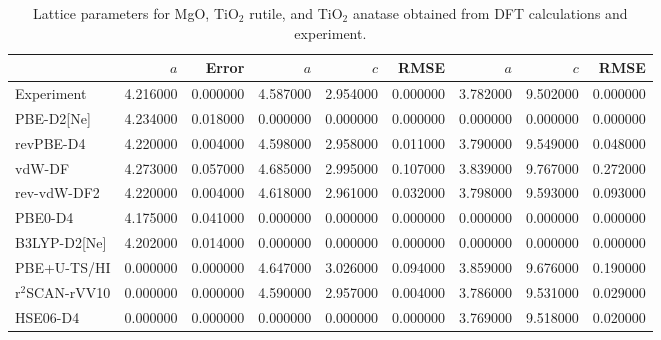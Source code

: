 \begin{table}
\caption{\label{tab:lattice_parameters}Lattice parameters for MgO, TiO$_2$ rutile, and TiO$_2$ anatase obtained from DFT calculations and experiment.}
\begin{adjustbox}{max width=1\textwidth}
\begin{tabular}{lrrrrrrrr}
\toprule
 & $a$ & Error & $a$ & $c$ & RMSE & $a$ & $c$ & RMSE \\ 
\midrule
Experiment & 4.216000 & 0.000000 & 4.587000 & 2.954000 & 0.000000 & 3.782000 & 9.502000 & 0.000000 \\
PBE-D2[Ne] & 4.234000 & 0.018000 & 0.000000 & 0.000000 & 0.000000 & 0.000000 & 0.000000 & 0.000000 \\
revPBE-D4 & 4.220000 & 0.004000 & 4.598000 & 2.958000 & 0.011000 & 3.790000 & 9.549000 & 0.048000 \\
vdW-DF & 4.273000 & 0.057000 & 4.685000 & 2.995000 & 0.107000 & 3.839000 & 9.767000 & 0.272000 \\
rev-vdW-DF2 & 4.220000 & 0.004000 & 4.618000 & 2.961000 & 0.032000 & 3.798000 & 9.593000 & 0.093000 \\
PBE0-D4 & 4.175000 & 0.041000 & 0.000000 & 0.000000 & 0.000000 & 0.000000 & 0.000000 & 0.000000 \\
B3LYP-D2[Ne] & 4.202000 & 0.014000 & 0.000000 & 0.000000 & 0.000000 & 0.000000 & 0.000000 & 0.000000 \\
PBE+U-TS/HI & 0.000000 & 0.000000 & 4.647000 & 3.026000 & 0.094000 & 3.859000 & 9.676000 & 0.190000 \\
r$^2$SCAN-rVV10 & 0.000000 & 0.000000 & 4.590000 & 2.957000 & 0.004000 & 3.786000 & 9.531000 & 0.029000 \\
HSE06-D4 & 0.000000 & 0.000000 & 0.000000 & 0.000000 & 0.000000 & 3.769000 & 9.518000 & 0.020000 \\
\bottomrule
\end{tabular}
\end{adjustbox}
\end{table}